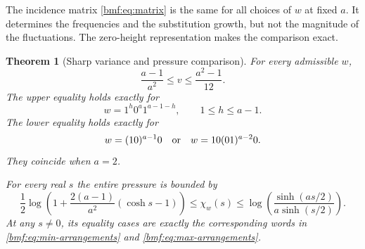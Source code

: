 \documentclass[11pt]{article}
\numberwithin{equation}{section}
\newtheorem{theorem}{Theorem}[section]
\theoremstyle{definition}
\theoremstyle{remark}
\begin{document}
The incidence matrix \eqref{bmf:eq:matrix} is the same for all choices
of $w$ at fixed $a$. It determines the frequencies and the
substitution growth, but not the magnitude of the fluctuations.
The zero-height representation makes the comparison exact.

\begin{theorem}[Sharp variance and pressure comparison]\label{bmf:thm:arrangements}
For every admissible $w$,
\begin{equation}\label{bmf:eq:variance-extrema}
 \boxed{\displaystyle
 \frac{a-1}{a^2}\leq v\leq\frac{a^2-1}{12}.}
\end{equation}
The upper equality holds exactly for
\begin{equation}\label{bmf:eq:max-arrangements}
 w=1^h0^a1^{a-1-h},\qquad 1\leq h\leq a-1.
\end{equation}
The lower equality holds exactly for
\begin{equation}\label{bmf:eq:min-arrangements}
 w=(10)^{a-1}0
 \quad\hbox{or}\quad
 w=10(01)^{a-2}0.
\end{equation}
They coincide when $a=2$.

For every real $s$ the entire pressure is bounded by
\begin{equation}\label{bmf:eq:pressure-comparison}
 \frac12\log\left(1+\frac{2(a-1)}{a^2}(\cosh s-1)\right)
 \leq\chi_w(s)\leq
 \log\left(\frac{\sinh(as/2)}{a\sinh(s/2)}\right).
\end{equation}
At any $s\ne0$, its equality cases are exactly the corresponding
words in \eqref{bmf:eq:min-arrangements} and
\eqref{bmf:eq:max-arrangements}.
\end{theorem}
\end{document}

